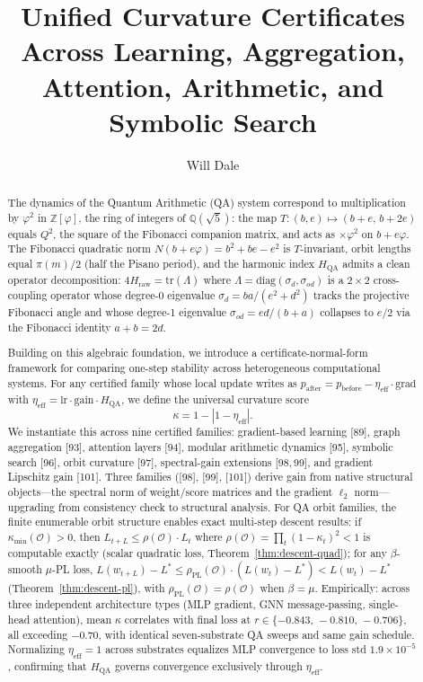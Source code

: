 \documentclass[11pt]{article}
\title{\textbf{Unified Curvature Certificates Across Learning, Aggregation,\\
Attention, Arithmetic, and Symbolic Search}}
\author{Will Dale}
\date{}
\theoremstyle{definition}
\theoremstyle{remark}
\newcommand{\hqa}{H_{\mathrm{QA}}}
\newcommand{\hraw}{H_{\mathrm{raw}}}
\newcommand{\etaeff}{\eta_{\mathrm{eff}}}
\newcommand{\kmin}{\kappa_{\min}}
\newcommand{\rhoO}{\rho(\mathcal{O})}
\newcommand{\rhoPL}{\rho_{\mathrm{PL}}(\mathcal{O})}
\newcommand{\Zfi}{\mathbb{Z}[\varphi]}
\newcommand{\Qfi}{\mathbb{Q}(\sqrt{5})}
\begin{document}
\maketitle

\begin{abstract}
The dynamics of the Quantum Arithmetic (QA) system correspond to multiplication
by $\varphi^2$ in $\Zfi$, the ring of integers of $\Qfi$: the map
$T:(b,e)\mapsto(b{+}e,\,b{+}2e)$ equals $Q^2$, the square of the Fibonacci
companion matrix, and acts as ${\times}\varphi^2$ on $b+e\varphi$. The Fibonacci
quadratic norm $N(b+e\varphi)=b^2+be-e^2$ is $T$-invariant, orbit lengths equal
$\pi(m)/2$ (half the Pisano period), and the harmonic index $\hqa$ admits a clean
operator decomposition: $4\hraw=\mathrm{tr}(\Lambda)$ where
$\Lambda=\mathrm{diag}(\sigma_d,\sigma_{od})$ is a $2\times 2$ cross-coupling
operator whose degree-0 eigenvalue $\sigma_d=ba/(e^2+d^2)$ tracks the projective
Fibonacci angle and whose degree-1 eigenvalue $\sigma_{od}=ed/(b+a)$ collapses to
$e/2$ via the Fibonacci identity $a+b=2d$.

Building on this algebraic foundation, we introduce a certificate-normal-form
framework for comparing one-step stability across heterogeneous computational systems.
For any certified family whose local update writes as
$p_{\mathrm{after}}=p_{\mathrm{before}}-\etaeff\cdot\mathrm{grad}$ with
$\etaeff=\mathrm{lr}\cdot\mathrm{gain}\cdot\hqa$, we define the universal
curvature score
\[
  \kappa = 1 - |1-\etaeff|.
\]
We instantiate this across nine certified families: gradient-based learning [89],
graph aggregation [93], attention layers [94], modular arithmetic dynamics [95],
symbolic search [96], orbit curvature [97], spectral-gain extensions [98,\,99],
and gradient Lipschitz gain [101]. Three families ([98], [99], [101]) derive gain
from native structural objects---the spectral norm of weight/score matrices and the
gradient $\ell_2$ norm---upgrading from consistency check to structural analysis.
For QA orbit families, the finite enumerable orbit structure enables exact multi-step
descent results: if $\kmin(\mathcal{O})>0$, then
$L_{t+L}\leq\rhoO\cdot L_t$ where $\rhoO=\prod_t(1-\kappa_t)^2<1$ is computable
exactly (scalar quadratic loss, Theorem~\ref{thm:descent-quad}); for any
$\beta$-smooth $\mu$-PL loss,
$L(w_{t+L})-L^*\leq\rhoPL\cdot(L(w_t)-L^*)<L(w_t)-L^*$
(Theorem~\ref{thm:descent-pl}), with $\rhoPL=\rhoO$ when $\beta=\mu$.
Empirically: across three independent architecture types (MLP gradient, GNN
message-passing, single-head attention), mean $\kappa$ correlates with final loss at
$r\in\{-0.843,\,-0.810,\,-0.706\}$, all exceeding $-0.70$, with identical
seven-substrate QA sweeps and same gain schedule. Normalizing $\etaeff=1$ across
substrates equalizes MLP convergence to loss std $1.9\times10^{-5}$, confirming that
$\hqa$ governs convergence exclusively through $\etaeff$.
\end{abstract}
\end{document}
